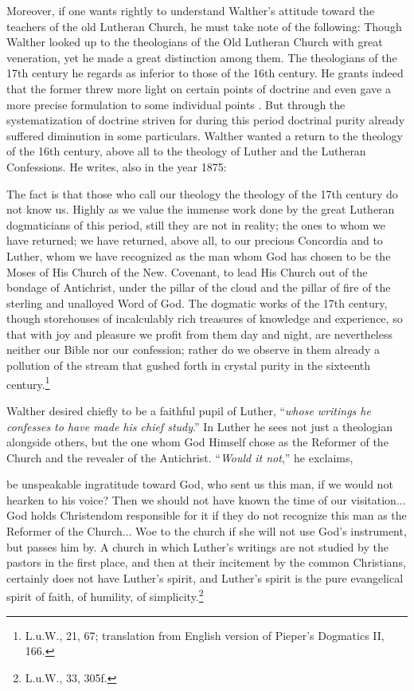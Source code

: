                 Moreover, if one wants rightly to understand Walther’s attitude toward the teachers of the old Lutheran Church, he must take note of the following: Though Walther looked up to the theologians of the Old Lutheran Church with great veneration, yet he made a great distinction among them.  The theologians of the 17th century he regards as inferior to those of the 16th century.  He grants indeed that the former threw more light on certain points of doctrine and even gave a more precise formulation to some individual points .  But through the systematization of doctrine striven for during this period doctrinal purity already suffered diminution in some particulars.  Walther wanted a return to the theology of the 16th century, above all to the theology of Luther and the Lutheran Confessions.  He writes, also in the year \textsc{1875}:\begin{fancyquotes}The fact is that those who call our theology the theology of the 17th century do not know us.  Highly as we value the immense work done by the great Lutheran dogmaticians of this period, still they are not in reality; the ones to whom we have returned; we have returned, above all, to our precious Concordia and to Luther, whom we have recognized as the man whom God has chosen to be the Moses of His Church of the New. Covenant, to lead His Church out of the bondage of Antichrist, under the pillar of the cloud and the pillar of fire of the sterling and unalloyed Word of God.  The dogmatic works of the 17th century, though storehouses of incalculably rich treasures of knowledge and experience, so that with joy and pleasure we profit from them day and night, are nevertheless neither our Bible nor our confession; rather do we observe in them already a pollution of the stream that gushed forth in crystal purity in the sixteenth century.\footnote{L.u.W., 21, 67; translation from English version of Pieper’s Dogmatics II, 166.}\end{fancyquotes}  Walther desired chiefly to be a faithful pupil of Luther, “\textit{whose writings he confesses to have made his chief study}.”  In Luther he sees not just a theologian alongside others, but the one whom God Himself chose as the Reformer of the Church and the revealer of the Antichrist.  “\textit{Would it not},” he exclaims,~\\\begin{fancyquotes}be unspeakable ingratitude toward God, who sent us this man, if we would not hearken to his voice?  Then we should not have known the time of our visitation... God holds Christendom responsible for it if they do not recognize this man as the Reformer of the Church... Woe to the church if she will not use God’s instrument, but passes him by.  A church in which Luther’s writings are not studied by the pastors in the first place, and then at their incitement by the common Christians, certainly does not have Luther’s spirit, and Luther’s spirit is the pure evangelical spirit of faith, of humility, of simplicity.\footnote{L.u.W., 33, 305f.}\end{fancyquotes}
                
